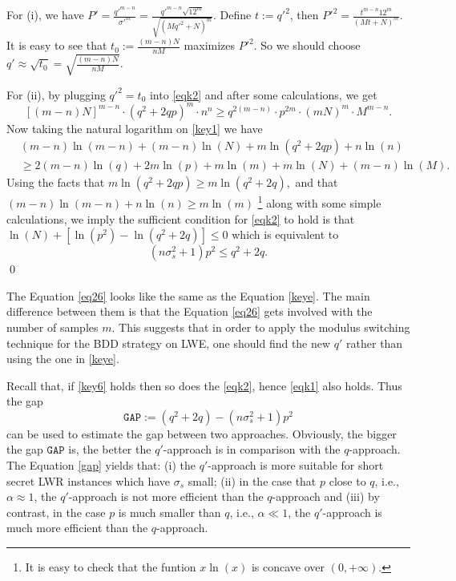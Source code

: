\documentclass[runningheads]{llncs}
\begin{document}
For (i),  we have $P'=\frac{ q'^{m-n}}{ \sigma'^m}=\frac{q'^{m-n}\sqrt{12^m}}{\sqrt{(Mq'^2+N)^m}}$. Define $t:={q'}^2$, then ${P'}^2=\frac{t^{m-n}12^m}{(Mt+N)^m}$. It is easy to see that $t_0:=\frac{(m-n)N}{nM}$ maximizes ${P'}^2$. So we should choose $q' \approx \sqrt{t_0}= \sqrt{\frac{(m-n)N}{nM}}$.
 
 For (ii), by plugging $q'^2=t_0$ into \eqref{eqk2} and after some calculations, we get
 \begin{equation}\label{key1}
[(m-n)N]^{m-n}　\cdot 　(q^2+2qp)^m \cdot  n^n \geq q^{2(m-n)} \cdot p^{2m} \cdot (mN)^m \cdot  M^{m-n}.
 \end{equation}
 Now taking the natural logarithm on \eqref{key1} we have 
  \begin{equation*}
  \begin{split}
 &(m-n)\ln (m-n)+　(m-n)\ln (N) +m \ln (q^2+2qp)+ n \ln (n) \\
 &\geq 2(m-n)\ln (q)+  2m \ln(p)+ m \ln(m)+ m\ln(N) +(m-n)\ln(M).
 \end{split}
 \end{equation*}
 Using the facts that 
 $m \ln (q^2+2qp) \geq m\ln (q^2+2q),$ 
 and that 
 $(m-n)\ln (m-n)+ n \ln(n) \geq m \ln(m)$
 \footnote[3]{It is easy to check that the funtion $x\ln(x)$ is concave  over $(0, +\infty)$.} along with some simple calculations, we imply the sufficient condition for \eqref{eqk2} to hold is that $ \ln(N)+[\ln(p^2)-\ln (q^2+2q)]\leq 0$
which is equivalent to
$$ (n\sigma_s^2+1)p^2 \leq q^2+2q.$$
 \qed
 
 
 \begin{remark} 
 The Equation \eqref{eq26} looks like the same as the Equation \eqref{keye}. The main difference between them is that the Equation  \eqref{eq26} gets involved with the number of samples $m$. This suggests that in order to apply the modulus switching technique for the BDD strategy on LWE, one should find the new $q'$ rather than using the one in \eqref{keye}.
  \end{remark} 


 \begin{remark} 
 Recall that, if \eqref{key6} holds then so does the \eqref{eqk2}, hence \eqref{eqk1} also holds. Thus the gap \begin{equation}\label{gap}
 \mathtt{GAP}:=(q^2+2q)-(n\sigma_s^2+1)p^2
 \end{equation}
  can be used to estimate the gap between two approaches. Obviously, the bigger the gap $\mathtt{GAP}$ is, the better the $q'$-approach is in comparison with the $q$-approach. The Equation \eqref{gap} yields that: (i) the $q'$-approach is more suitable for short secret LWR instances which have $\sigma_s$ small; (ii) in the case that $p$ close to $q$, i.e.,  $\alpha \approx 1$,  the $q'$-approach is not more efficient than the $q$-approach and (iii) by contrast, in the case $p$ is much smaller than $q$, i.e.,  $\alpha \ll 1$, the $q'$-approach is much more efficient than the $q$-approach. 
 \end{remark} 
\end{document}
